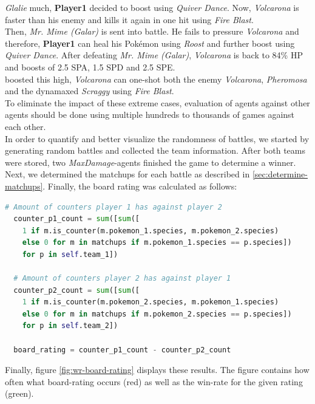 \textit{Glalie} much, \textbf{Player1} decided to boost using \textit{Quiver Dance}. Now, \textit{Volcarona}
is faster than his enemy and kills it again in one hit using \textit{Fire Blast}. \\
Then, \textit{Mr. Mime (Galar)} is sent into battle. He fails to pressure \textit{Volcarona} and therefore,
\textbf{Player1} can heal his Pokémon using \textit{Roost} and further boost using \textit{Quiver Dance}. After
defeating \textit{Mr. Mime (Galar)}, \textit{Volcarona} is back to 84\% HP and boosts of 2.5 \ac{SPA},
1.5 \ac{SPD} and 2.5 \ac{SPE}. \\
boosted this high, \textit{Volcarona} can one-shot both the enemy \textit{Volcarona},
\textit{Pheromosa} and the dynamaxed \textit{Scraggy} using \textit{Fire Blast}. \\
To eliminate the impact of these extreme cases, evaluation of agents against other agents 
should be done using multiple hundreds to thousands of games against each other. \\
In order to quantify and better visualize the randomness of battles, we started by generating 
 random battles and collected the team information. After
both teams were stored, two \emph{MaxDamage}-agents finished the game to determine a winner.
Next,
we determined the matchups for each battle as described in \ref{sec:determine-matchups}. Finally,
the board rating was calculated as follows:
\begin{lstlisting}[language=Python, caption=Calculate Board rating]
  # Amount of counters player 1 has against player 2
  counter_p1_count = sum([sum([
    1 if m.is_counter(m.pokemon_1.species, m.pokemon_2.species)
    else 0 for m in matchups if m.pokemon_1.species == p.species])
    for p in self.team_1])

  # Amount of counters player 2 has against player 1
  counter_p2_count = sum([sum([
    1 if m.is_counter(m.pokemon_2.species, m.pokemon_1.species)
    else 0 for m in matchups if m.pokemon_2.species == p.species])
    for p in self.team_2])

  board_rating = counter_p1_count - counter_p2_count
\end{lstlisting}
Finally, figure \ref{fig:wr-board-rating} displays these results. The figure contains how often what board-rating
occurs (red) as well as the win-rate for the given rating (green).

